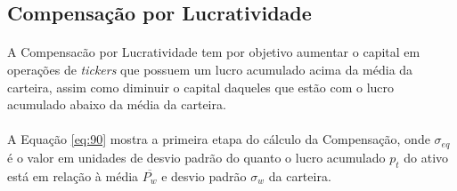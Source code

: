 



\FloatBarrier
\subsection{Compensação por Lucratividade}
\label{profit_comp}

\paragraph{} A Compensacão por Lucratividade tem por objetivo aumentar o capital em operações de \textit{tickers} que possuem um lucro acumulado acima da média da carteira, assim como diminuir o capital daqueles que estão com o lucro acumulado abaixo da média da carteira.

\paragraph{} A Equação \ref{eq:90} mostra a primeira etapa do cálculo da Compensação, onde \begin{math} \sigma_{eq} \end{math} é o valor em unidades de desvio padrão do quanto o lucro acumulado \begin{math} p_t \end{math} do ativo está em relação à média \begin{math} \overline{P_w} \end{math} e desvio padrão \begin{math} \sigma_w \end{math} da carteira.

